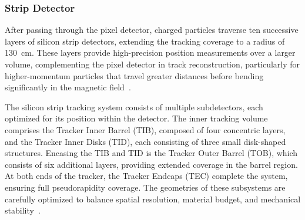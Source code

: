 

\subsubsection{Strip Detector}


After passing through the pixel detector, charged particles traverse ten successive layers of silicon strip detectors, extending the tracking coverage to a radius of 130~cm. These layers provide high-precision position measurements over a larger volume, complementing the pixel detector in track reconstruction, particularly for higher-momentum particles that travel greater distances before bending significantly in the magnetic field~\cite{Chatrchyan:1667597}. 

The silicon strip tracking system consists of multiple subdetectors, each optimized for its position within the detector. The inner tracking volume comprises the Tracker Inner Barrel (TIB), composed of four concentric layers, and the Tracker Inner Disks (TID), each consisting of three small disk-shaped structures. Encasing the TIB and TID is the Tracker Outer Barrel (TOB), which consists of six additional layers, providing extended coverage in the barrel region. At both ends of the tracker, the Tracker Endcaps (TEC) complete the system, ensuring full pseudorapidity coverage. The geometries of these subsystems are carefully optimized to balance spatial resolution, material budget, and mechanical stability~\cite{CMS:trackerTDR}. 

